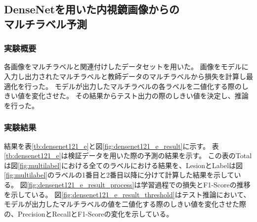\subsection{DenseNetを用いた内視鏡画像からの\\マルチラベル予測}
\subsubsection{実験概要}
各画像をマルチラベルと関連付けしたデータセットを用いた。
画像をモデルに入力し出力されたマルチラベルと教師データのマルチラベルから損失を計算し最適化を行った。
モデルが出力したマルチラベルの各ラベルを二値化する際のしきい値を変化させた。
その結果からテスト出力の際のしきい値を決定し、推論を行った。

\subsubsection{実験結果}
結果を表\ref{tb:densenet121_e}と図\ref{fig:densenet121_e_result}に示す。
表\ref{tb:densenet121_e}は検証データを用いた際の予測の結果を示す。
この表のTotalは図\ref{fig:multilabel}における全てのラベルにおける結果を、LesionとLabelは図\ref{fig:multilabel}のラベルの1番目と2番目以降に分けて計算した結果を示している。
図\ref{fig:densenet121_e_result_process}は学習過程での損失とF1-Scoreの推移を示している。
図\ref{fig:densenet121_e_result_threshold}はテスト推論において、モデルが出力したマルチラベルの値を二値化する際のしきい値を変化させた際の、PrecisionとRecallとF1-Scoreの変化を示している。

